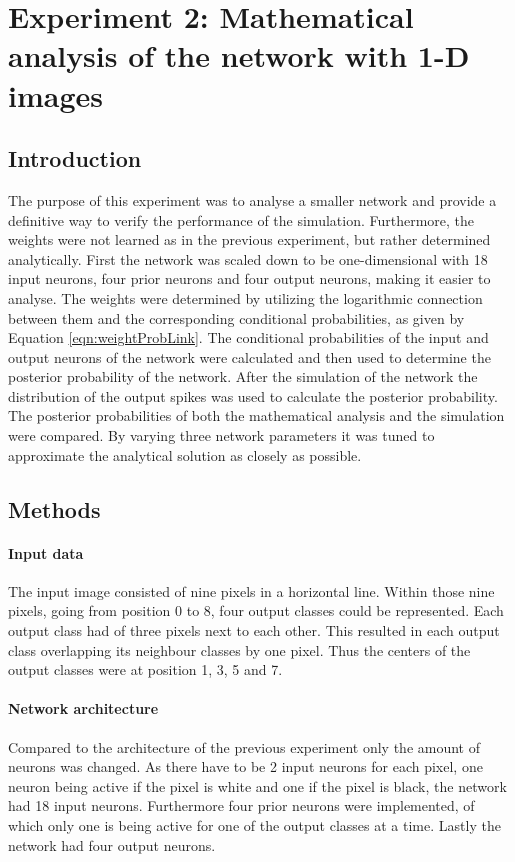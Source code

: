 \section{Experiment 2: Mathematical analysis of the network with 1-D images}
\label{section:1D}

\subsection{Introduction}

The purpose of this experiment was to analyse a smaller network and provide a definitive way to verify the performance of the simulation. Furthermore, the weights were not learned as in the previous experiment, but rather determined analytically.
First the network was scaled down to be one-dimensional with 18 input neurons, four prior neurons and four output neurons, making it easier to analyse. The weights were determined by utilizing the logarithmic connection between them and the corresponding conditional probabilities, as given by Equation \ref{eqn:weightProbLink}. The conditional probabilities of the input and output neurons of the network  were calculated and then used to determine the posterior probability of the network. After the simulation of the network the distribution of the output spikes was used to calculate the posterior probability. The posterior probabilities of both the mathematical analysis and the simulation were compared. By varying three network parameters it was tuned to approximate the analytical solution as closely as possible.

\subsection{Methods}

\paragraph{Input data}
The input image consisted of nine pixels in a horizontal line. Within those nine pixels, going from position 0 to 8, four output classes could be represented. Each output class had of three pixels next to each other. This resulted in each output class overlapping its neighbour classes by one pixel. Thus the centers of the output classes were at position 1, 3, 5 and 7.
 
\paragraph{Network architecture}
Compared to the architecture of the previous experiment only the amount of neurons was changed. As there have to be 2 input neurons for each pixel, one neuron being active if the pixel is white and one if the pixel is black, the network had 18 input neurons. Furthermore four prior neurons were implemented, of which only one is being active for one of the output classes at a time. Lastly the network had four output neurons.

